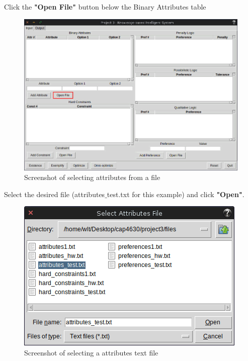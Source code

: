 \documentclass[12pt]{report}
\begin{document}
\begin{description}[leftmargin=4em]
\item [Step 1:] Click the \textbf{"Open File"} button below the Binary Attributes table
\begin{figure}[H]
\begin{center}
\includegraphics[scale=0.3,trim=1cm 1cm 1cm 1cm]{input_attributes}
\caption{Screenshot of selecting attributes from a file}
\end{center}
\end{figure}
\vspace{-2.5em}
\item [Step 2:] Select the desired file (attributes$\_$test.txt for this example) and click \textbf{"Open"}.
\begin{figure}[H]
\begin{center}
\includegraphics[scale=0.3,trim=1cm 1cm 1cm 1cm]{select_attributes}
\caption{Screenshot of selecting a attributes text file}
\end{center}

\end{figure}
\end{description}
\end{document}
